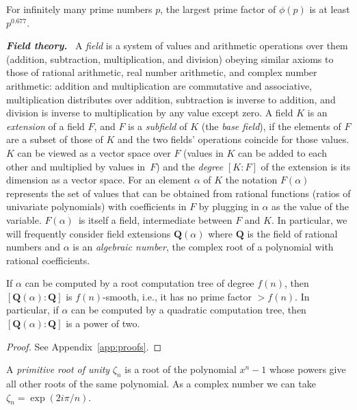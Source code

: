 \documentclass[oribibl,10pt]{llncs}
\newcommand{\rationals}{\mathbf{Q}}
\newcommand{\Emph}[1]{\smallskip\textbf{\textit{#1}}~}
\begin{document}
\begin{lemma}
\label{lem:large-prime-factor-of-phi}
For infinitely many prime numbers $p$, the largest prime factor of $\phi(p)$  is at least $p^{0.677}$.
\end{lemma}

\Emph{Field theory.}
A \emph{field} is a system of values and arithmetic operations over them (addition, subtraction, multiplication, and division) obeying similar axioms to those of rational arithmetic, real number arithmetic, and complex number arithmetic: addition and multiplication are commutative and associative, multiplication distributes over addition, subtraction is inverse to addition, and division is inverse to multiplication by any value except zero. A field $K$ is an \emph{extension} of a field $F$, and $F$ is a \emph{subfield} of $K$ (the \emph{base field}), if the elements of $F$ are a subset of those of $K$ and the two fields' operations coincide for those values. $K$ can be viewed as a vector space over $F$ (values in $K$ can be added to each other and multiplied by values in~$F$) and the \emph{degree} $[K:F]$ of the extension is its dimension as a vector space.
For an element $\alpha$ of $K$ the notation $F(\alpha)$ represents the set of values that can be obtained from rational functions (ratios of univariate polynomials) with coefficients in $F$ by plugging in $\alpha$ as the value of the variable. $F(\alpha)$~is itself a field, intermediate between $F$ and $K$. In particular, we will frequently consider field extensions $\rationals(\alpha)$ where $\rationals$ is the field of rational numbers and $\alpha$ is an \emph{algebraic number}, the complex root of a polynomial with rational coefficients.

\begin{lemma}\label{lem:extensions}
If $\alpha$ can be computed by a root computation tree of degree $f(n)$, then $[\rationals(\alpha):\rationals]$ is $f(n)$-smooth, i.e., it has no prime factor  $>f(n)$. In particular, if $\alpha$ can be computed by a quadratic computation tree, then $[\rationals(\alpha):\rationals]$ is a power of two.
\end{lemma}

\begin{proof}
See Appendix~\ref{app:proofs}.
\end{proof}

A \emph{primitive root of unity} $\zeta_n$ is a root of
\ifFull
the polynomial
\fi
$x^n-1$ whose powers give all  other roots of the same polynomial. As a complex number we can take
$\zeta_n=\exp(2i\pi/n)$.
\end{document}
